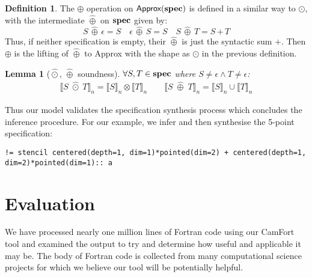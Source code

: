 \documentclass[10pt,preprint]{sigplanconf}
\newcounter{block}
\newtheorem{lemma}[block]{Lemma}
\theoremstyle{definition}
\newtheorem{definition}[block]{Definition}
\newcommand{\interp}[1]{\llbracket{#1}\rrbracket}
\newcommand{\term}[1]{\texttt{#1}}
\begin{document}
\begin{definition}The $\oplus$ operation on $\textsf{Approx}(\textbf{spec})$
is defined in a similar way to $\odot$, with the intermediate $\hat{\oplus}$ on
$\textbf{spec}$ given by:
\begin{equation*}
S \,\hat{\oplus}\, \epsilon = S \quad
\epsilon \,\hat{\oplus}\, S = S \quad
S \, \hat{\oplus} \, T = S \, \term{+} \, T
\end{equation*}
Thus, if neither specification is empty, their $\hat{\oplus}$ is just
the syntactic sum $\term{+}$. Then $\oplus$ is the lifting of
$\hat{\oplus}$ to \textsf{Approx} with the shape as $\odot$ in the previous
definition.
\end{definition}

\begin{lemma}[$\hat{\odot}$, $\hat{\oplus}$ soundness]$\forall S,
  T \in \textbf{spec}$ where $S\!\neq \epsilon \wedge T\!\neq \epsilon$:
\begin{align*}
\interp{S \; \hat{\odot} \; T}_n = \interp{S}_n \otimes \interp{T}_n
  \qquad
\interp{S \; \hat{\oplus} \; T}_n = \interp{S}_n \cup \interp{T}_n
\end{align*}
\label{lem:alg-soundness}
\vspace{-2em}
\end{lemma}
%
\noindent
Thus our model validates the specification synthesis process which concludes the
inference procedure. For our example, we infer and then synthesise the
5-point specification:
\begin{verbatim}
!= stencil centered(depth=1, dim=1)*pointed(dim=2) + centered(depth=1, dim=2)*pointed(dim=1):: a
\end{verbatim}

\section{Evaluation}

We have processed nearly one million lines of Fortran code using our
CamFort tool and examined the output to try and determine how useful
and applicable it may be. The body of Fortran code is collected from
many computational science projects for which we believe our tool will
be potentially helpful.

\end{document}

